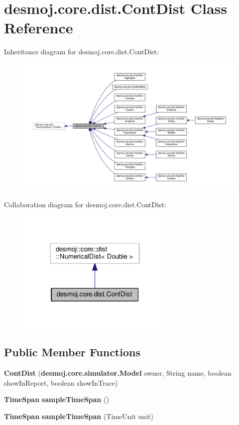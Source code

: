 \section{desmoj.\-core.\-dist.\-Cont\-Dist Class Reference}
\label{classdesmoj_1_1core_1_1dist_1_1_cont_dist}


Inheritance diagram for desmoj.\-core.\-dist.\-Cont\-Dist\-:
\nopagebreak
\begin{figure}[H]
\begin{center}
\leavevmode
\includegraphics[width=350pt]{classdesmoj_1_1core_1_1dist_1_1_cont_dist__inherit__graph}
\end{center}
\end{figure}


Collaboration diagram for desmoj.\-core.\-dist.\-Cont\-Dist\-:
\nopagebreak
\begin{figure}[H]
\begin{center}
\leavevmode
\includegraphics[width=214pt]{classdesmoj_1_1core_1_1dist_1_1_cont_dist__coll__graph}
\end{center}
\end{figure}
\subsection*{Public Member Functions}
\begin{DoxyCompactItemize}
\item 
{\bf Cont\-Dist} ({\bf desmoj.\-core.\-simulator.\-Model} owner, String name, boolean show\-In\-Report, boolean show\-In\-Trace)
\item 
{\bf Time\-Span} {\bf sample\-Time\-Span} ()
\item 
{\bf Time\-Span} {\bf sample\-Time\-Span} (Time\-Unit unit)
\end{DoxyCompactItemize}


